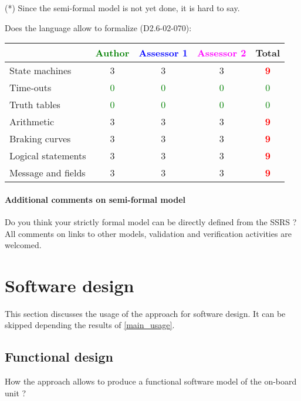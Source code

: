 \begin{author_comment}
(*) Since the semi-formal model is not yet done, it is hard to say.
\end{author_comment}
Does the language allow to  formalize (D2.6-02-070):

\begin{tabular}{|l | c | c | c | c|}
\hline
& \textcolor{green}{Author} & \textcolor{blue}{Assessor 1} & \textcolor{magenta}{Assessor 2} & Total \\
\hline 
State machines  &3 &3 & 3     & \textcolor{red}{\textbf{9}} \\
\hline
Time-outs  & \textcolor{green}{0}   & \textcolor{green}{0}   & \textcolor{green}{0} & \textcolor{green}{0} \\
\hline
Truth tables  & \textcolor{green}{0}   & \textcolor{green}{0}   & \textcolor{green}{0} & \textcolor{green}{0} \\
\hline
Arithmetic  &3 &3 & 3    & \textcolor{red}{\textbf{9}} \\
\hline
Braking curves  &3 &3 & 3    & \textcolor{red}{\textbf{9}} \\
\hline
Logical statements &3 &3 & 3    & \textcolor{red}{\textbf{9}} \\
\hline
Message and fields &3 &3 & 3    & \textcolor{red}{\textbf{9}} \\
\hline
\end{tabular}

\paragraph{Additional comments on semi-formal  model} Do you think your strictly formal  model can be directly defined from the SSRS ?
All comments on links to  other models, validation and verification activities are welcomed.


\section{Software design}
This section discusses the usage of the approach for software design.
It can be skipped depending the results of \ref{main_usage}.

\subsection{Functional design}

How the approach allows to  produce a functional software model of the on-board unit ?

